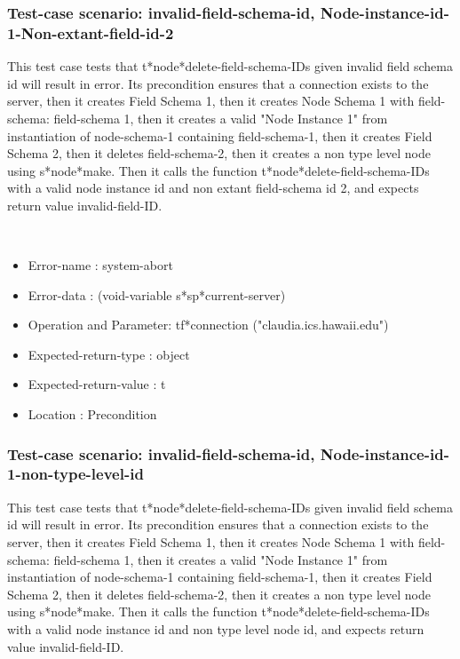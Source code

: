 \subsubsection {Test-case scenario: invalid-field-schema-id, Node-instance-id-1-Non-extant-field-id-2}


This test case tests that t*node*delete-field-schema-IDs given invalid field schema id will result in error.
Its precondition ensures that a connection exists to the server, then it creates Field Schema 1, then it creates Node Schema 1 with field-schema: field-schema 1, then it creates a valid "Node Instance 1" from instantiation of node-schema-1 containing field-schema-1, then it creates Field Schema 2, then it deletes field-schema-2, then it creates a non type level node using s*node*make.
Then it calls the function t*node*delete-field-schema-IDs  with a valid node instance id and non extant field-schema id 2, and expects return value invalid-field-ID.



\
\begin {itemize}
\item 	Error-name             : system-abort
\item Error-data             : (void-variable s*sp*current-server)
\item Operation and Parameter: tf*connection ("claudia.ics.hawaii.edu")
\item Expected-return-type   : object
\item Expected-return-value  : t
\item Location               : Precondition



\end {itemize}
\subsubsection {Test-case scenario: invalid-field-schema-id, Node-instance-id-1-non-type-level-id}


This test case tests that t*node*delete-field-schema-IDs given invalid field schema id will result in error.
Its precondition ensures that a connection exists to the server, then it creates Field Schema 1, then it creates Node Schema 1 with field-schema: field-schema 1, then it creates a valid "Node Instance 1" from instantiation of node-schema-1 containing field-schema-1, then it creates Field Schema 2, then it deletes field-schema-2, then it creates a non type level node using s*node*make.
Then it calls the function t*node*delete-field-schema-IDs  with a valid node instance id and non type level node id, and expects return value invalid-field-ID.



